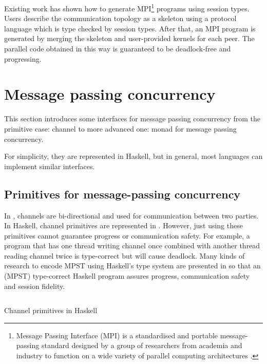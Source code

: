 Existing work\cite{ngSafeMPICode} has shown how to generate MPI\footnote{Message Passing Interface (MPI) is a standardised and portable message-passing standard designed by a group of researchers from academia and industry to function on a wide variety of parallel computing architectures \cite{MessagePassingInterface2018}.} programs using session types. Users describe the communication topology as a skeleton using a protocol language which is type checked by session types. After that, an MPI program is generated by merging the skeleton and user-provided kernels for each peer. The parallel code obtained in this way is guaranteed to be deadlock-free and progressing. 

\section{Message passing concurrency} \label{b:mo}
This section introduces some interfaces for message passing concurrency from the primitive case: channel to more advanced one: monad for message passing concurrency.

For simplicity, they are represented in Haskell, but in general, most languages can implement similar interfaces. 
\subsection{Primitives for message-passing concurrency} \label{b:mo:mpc}
In , channels are bi-directional and used for communication between two parties. In Haskell, channel primitives are represented in . However, just using these primitives cannot guarantee progress or communication safety. For example, a program that has one thread writing channel once combined with another thread reading channel twice is type-correct but will cause deadlock. Many kinds of research to encode MPST using Haskell's type system are presented in \cite{orchardSessionTypesLinearity} so that an (MPST) type-correct Haskell program assures progress, communication safety and session fidelity.
\begin{listing}[ht]
  \inputminted{haskell}{background/mo-chan.hs}
  \caption{Channel primitives in Haskell}
  \label{b:mo:c1}
\end{listing}
